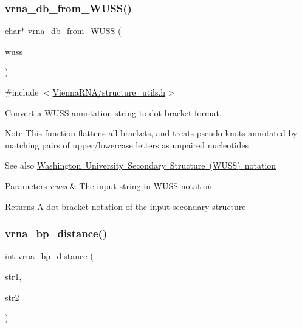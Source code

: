 \subsubsection{\texorpdfstring{vrna\+\_\+db\+\_\+from\+\_\+\+W\+U\+S\+S()}{vrna\_db\_from\_WUSS()}}
{\footnotesize\ttfamily char$\ast$ vrna\+\_\+db\+\_\+from\+\_\+\+W\+U\+SS (\begin{DoxyParamCaption}\item[{const char $\ast$}]{wuss }\end{DoxyParamCaption})}



{\ttfamily \#include $<$\mbox{\hyperlink{structure__utils_8h}{Vienna\+R\+N\+A/structure\+\_\+utils.\+h}}$>$}



Convert a W\+U\+SS annotation string to dot-\/bracket format. 

\begin{DoxyNote}{Note}
This function flattens all brackets, and treats pseudo-\/knots annotated by matching pairs of upper/lowercase letters as unpaired nucleotides
\end{DoxyNote}
\begin{DoxySeeAlso}{See also}
\mbox{\hyperlink{rna_structure_notations_wuss-notation}{Washington University Secondary Structure (W\+U\+SS) notation}}
\end{DoxySeeAlso}

\begin{DoxyParams}{Parameters}
{\em wuss} & The input string in W\+U\+SS notation \\
\hline
\end{DoxyParams}
\begin{DoxyReturn}{Returns}
A dot-\/bracket notation of the input secondary structure 
\end{DoxyReturn}
\mbox{\label{group__struct__utils_ga65bdfbac6a16bf30286e8a3f7d15f60a}} 
\subsubsection{\texorpdfstring{vrna\+\_\+bp\+\_\+distance()}{vrna\_bp\_distance()}}
{\footnotesize\ttfamily int vrna\+\_\+bp\+\_\+distance (\begin{DoxyParamCaption}\item[{const char $\ast$}]{str1,  }\item[{const char $\ast$}]{str2 }\end{DoxyParamCaption})}




